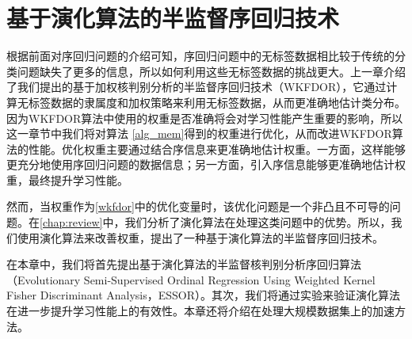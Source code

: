 \chapter{基于演化算法的半监督序回归技术}
\label{chap:essor}
根据前面对序回归问题的介绍可知，序回归问题中的无标签数据相比较于传统的分类问题缺失了更多的信息，所以如何利用这些无标签数据的挑战更大。上一章介绍了我们提出的基于加权核判别分析的半监督序回归技术（WKFDOR），它通过计算无标签数据的隶属度和加权策略来利用无标签数据，从而更准确地估计类分布。因为WKFDOR算法中使用的权重是否准确将会对学习性能产生重要的影响，所以这一章节中我们将对算法 \ref{alg_mem}得到的权重进行优化，从而改进WKFDOR算法的性能。优化权重主要通过结合序信息来更准确地估计权重。一方面，这样能够更充分地使用序回归问题的数据信息；另一方面，引入序信息能够更准确地估计权重，最终提升学习性能。

然而，当权重作为\autoref{wkfdor}中的优化变量时，该优化问题是一个非凸且不可导的问题。在\autoref{chap:review}中，我们分析了演化算法在处理这类问题中的优势。所以，我们使用演化算法来改善权重，提出了一种基于演化算法的半监督序回归技术。

在本章中，我们将首先提出基于演化算法的半监督核判别分析序回归算法（Evolutionary Semi-Supervised Ordinal Regression Using Weighted Kernel Fisher Discriminant Analysis，ESSOR）。其次，我们将通过实验来验证演化算法在进一步提升学习性能上的有效性。本章还将介绍在处理大规模数据集上的加速方法。


